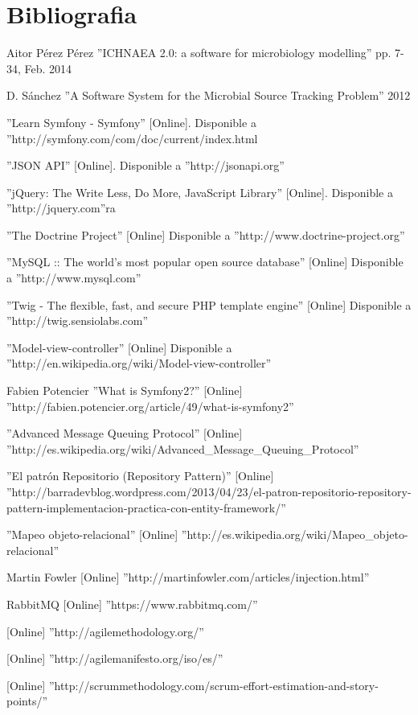 \chapter{Bibliografia}
\label{cha:bibliografia}
\begin{thebibliography}{100}
Aitor P\'{e}rez P\'{e}rez ''ICHNAEA 2.0: a software for microbiology modelling'' pp. 7-34, Feb. 2014

D. S\'{a}nchez ''A Software System for the Microbial Source Tracking Problem'' 2012

 ''Learn Symfony - Symfony'' [Online]. Disponible a ''http://symfony.com/com/doc/current/index.html

 ''JSON API''  [Online]. Disponible a ''http://jsonapi.org''

 ''jQuery: The Write Less, Do More, JavaScript Library'' [Online]. Disponible a ''http://jquery.com''ra

 ''The Doctrine Project'' [Online] Disponible a ''http://www.doctrine-project.org''

 ''MySQL :: The world's most popular open source database'' [Online] Disponible a ''http://www.mysql.com''

 ''Twig - The flexible, fast, and secure PHP template engine''  [Online] Disponible a ''http://twig.sensiolabs.com''

 ''Model-view-controller'' [Online] Disponible a ''http://en.wikipedia.org/wiki/Model-view-controller''

 Fabien Potencier ''What is Symfony2?'' [Online] ''http://fabien.potencier.org/article/49/what-is-symfony2''

 ''Advanced Message Queuing Protocol'' [Online] ''http://es.wikipedia.org/wiki/Advanced\_Message\_Queuing\_Protocol''

 ''El patr\'{o}n Repositorio (Repository Pattern)'' [Online] ''http://barradevblog.wordpress.com/2013/04/23/el-patron-repositorio-repository-pattern-implementacion-practica-con-entity-framework/''

 ''Mapeo objeto-relacional'' [Online] ''http://es.wikipedia.org/wiki/Mapeo_objeto-relacional''

 Martin Fowler [Online] ''http://martinfowler.com/articles/injection.html''

 RabbitMQ [Online] ''https://www.rabbitmq.com/''

 [Online] ''http://agilemethodology.org/''

 [Online] ''http://agilemanifesto.org/iso/es/''

 [Online] ''http://scrummethodology.com/scrum-effort-estimation-and-story-points/''
\end{thebibliography}
